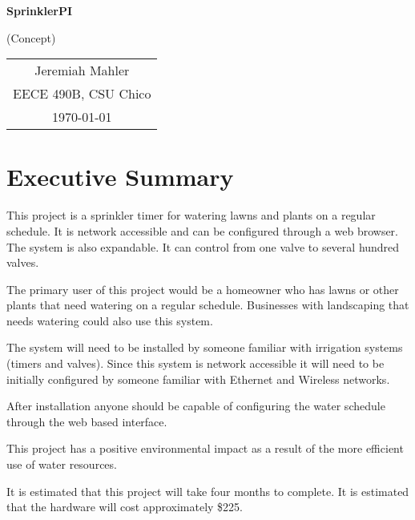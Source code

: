 \documentclass[12pt,letterpaper]{article}
\begin{document}

\thispagestyle{empty}

\vspace*{1.0in}

\centerline{\Large \textbf{SprinklerPI}}
\centerline{(Concept)}

\vspace{0.5in}

\begin{center}
\begin{tabular}{c}
Jeremiah Mahler \\
EECE 490B, CSU Chico \\
\today
\end{tabular}
\end{center}

\vfill


\pagebreak
\tableofcontents
{}
\pagebreak

\pagebreak
\section{Executive Summary}

This project is a sprinkler timer for watering lawns and plants
on a regular schedule.
It is network accessible and can be configured through a web browser.
The system is also expandable.
It can control from one valve to several hundred valves.

The primary user of this project would be a homeowner who has
lawns or other plants that need watering on a regular schedule.
Businesses with landscaping that needs watering could also use
this system.

The system will need to be installed by someone familiar with
irrigation systems (timers and valves).
Since this system is network accessible it will need to be initially
configured by someone familiar with Ethernet and Wireless networks.

After installation anyone should be capable of configuring the
water schedule through the web based interface.

This project has a positive environmental impact as a result of the
more efficient use of water resources.

It is estimated that this project will take four months to complete.
It is estimated that the hardware will cost approximately \$225.
\end{document}
